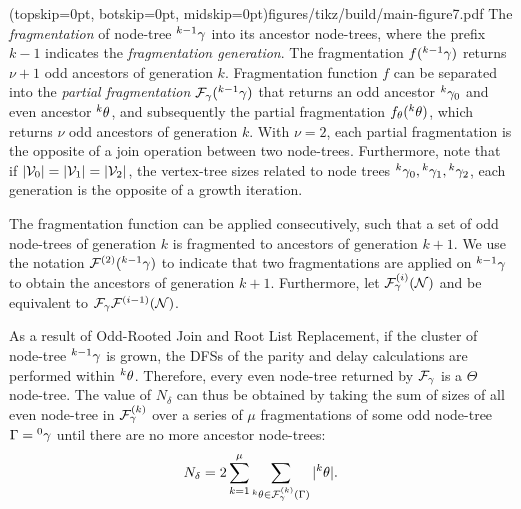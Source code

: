 \Figure[hbt](topskip=0pt, botskip=0pt, midskip=0pt){figures/tikz/build/main-figure7.pdf}{
  The \emph{fragmentation} of node-tree ${}^{k-1}\gamma$ into its ancestor node-trees, where the prefix $k-1$ indicates the \emph{fragmentation generation}. The fragmentation $f({}^{k-1}\gamma)$ returns $\nu+1$ odd ancestors of generation $k$. Fragmentation function $f$ can be separated into the \emph{partial fragmentation} $\mathcal{F}_\gamma({}^{k-1}\gamma)$ that returns an odd ancestor ${}^{k}\gamma_0$ and even ancestor ${}^{k}\theta$, and subsequently the partial fragmentation $f_\theta({}^{k}\theta)$, which returns $\nu$ odd ancestors of generation $k$. With $\nu=2$, each partial fragmentation is the opposite of a join operation between two node-trees. Furthermore, note that if $\lvert\mathcal{V}_0\rvert = \lvert\mathcal{V}_1\rvert = \lvert\mathcal{V}_2\rvert$, the vertex-tree sizes related to node trees ${}^{k}\gamma_0, {}^{k}\gamma_1, {}^{k}\gamma_2$, each generation is the opposite of a growth iteration. \label{fig6}}


The fragmentation function can be applied consecutively, such that a set of odd node-trees of generation $k$ is fragmented to ancestors of generation $k+1$. We use the notation $\mathcal{F}^{(2)}({}^{k-1}\gamma)$ to indicate that two fragmentations are applied on ${}^{k-1}\gamma$ to obtain the ancestors of generation $k+1$. Furthermore, let $\mathcal{F}_\gamma^{(i)}(\mathcal{N})$ and be equivalent to $\mathcal{F}_\gamma \mathcal{F}^{(i-1)}(\mathcal{N})$. 

As a result of Odd-Rooted Join and Root List Replacement, if the cluster of node-tree ${}^{k-1}\gamma$ is grown, the DFSs of the parity and delay calculations are performed within ${}^{k}\theta$. Therefore, every even node-tree returned by $\mathcal{F}_\gamma$ is a $\Theta$ node-tree. The value of $N_\delta$ can thus be obtained by taking the sum of sizes of all even node-tree in $\mathcal{F}_\gamma^{(k)}$ over a series of $\mu$ fragmentations of some odd node-tree $\Gamma = {}^{0}\gamma$ until there are no more ancestor node-trees:
\begin{equation}\label{eq:npdc}
  N_\delta = 2\sum_{k=1}^\mu{ \sum_{  {}^{k} \theta \in \mathcal{F}_\gamma^{(k)}(\Gamma) }{ \lvert {}^{k} \theta\rvert} }.
\end{equation}

